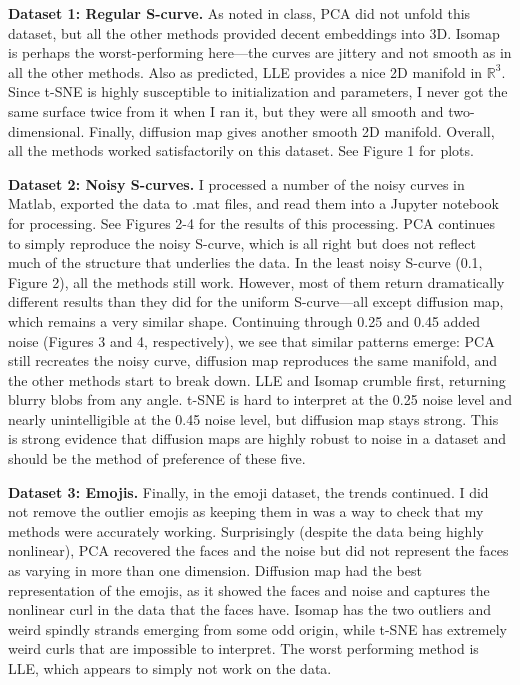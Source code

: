 \documentclass{letter}
\newcommand{\R}{\mathbb{R}}
\begin{document}
{    \textbf{Dataset 1: Regular S-curve.} As noted in class, PCA did not unfold this dataset, but all the other methods provided decent embeddings into 3D. Isomap is perhaps the worst-performing here---the curves are jittery and not smooth as in all the other methods. Also as predicted, LLE provides a nice 2D manifold in $\R^3$. Since t-SNE is highly susceptible to initialization and parameters, I never got the same surface twice from it when I ran it, but they were all smooth and two-dimensional. Finally, diffusion map gives another smooth 2D manifold. Overall, all the methods worked satisfactorily on this dataset. See Figure 1 for plots.

    \textbf{Dataset 2: Noisy S-curves.} I processed a number of the noisy curves in Matlab, exported the data to .mat files, and read them into a Jupyter notebook for processing. See Figures 2-4 for the results of this processing. PCA continues to simply reproduce the noisy S-curve, which is all right but does not reflect much of the structure that underlies the data. In the least noisy S-curve (0.1, Figure 2), all the methods still work. However, most of them return dramatically different results than they did for the uniform S-curve---all except diffusion map, which remains a very similar shape. Continuing through 0.25 and 0.45 added noise (Figures 3 and 4, respectively), we see that similar patterns emerge: PCA still recreates the noisy curve, diffusion map reproduces the same manifold, and the other methods start to break down. LLE and Isomap crumble first, returning blurry blobs from any angle. t-SNE is hard to interpret at the 0.25 noise level and nearly unintelligible at the 0.45 noise level, but diffusion map stays strong. This is strong evidence that diffusion maps are highly robust to noise in a dataset and should be the method of preference of these five.

    \textbf{Dataset 3: Emojis.} Finally, in the emoji dataset, the trends continued. I did not remove the outlier emojis as keeping them in was a way to check that my methods were accurately working. Surprisingly (despite the data being highly nonlinear), PCA recovered the faces and the noise but did not represent the faces as varying in more than one dimension. Diffusion map had the best representation of the emojis, as it showed the faces and noise and captures the nonlinear curl in the data that the faces have. Isomap has the two outliers and weird spindly strands emerging from some odd origin, while t-SNE has extremely weird curls that are impossible to interpret. The worst performing method is LLE, which appears to simply not work on the data.

}
\end{document}
